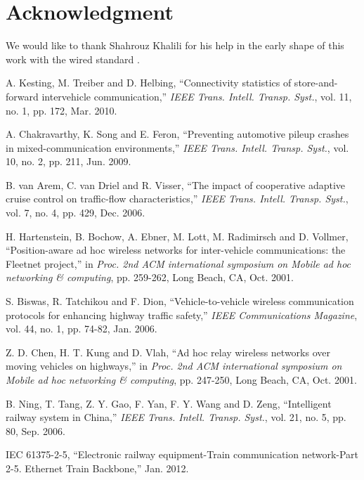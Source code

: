 \documentclass[10pt,english,two column]{IEEEtran}
\begin{document}
\section*{Acknowledgment}

We would like to thank Shahrouz Khalili for his help in the early
shape of this work with the wired standard \cite{IEC 61375}. 
\begin{thebibliography}{10}
A. Kesting, M. Treiber and D. Helbing, ``Connectivity
statistics of store-and-forward intervehicle communication,''\textit{
IEEE Trans. Intell. Transp. Syst.}, vol. 11, no. 1, pp. 172,
Mar. 2010.

A. Chakravarthy, K. Song and E. Feron, \textquotedblleft Preventing
automotive pileup crashes in mixed-communication environments,\textquotedblright{}
\textit{IEEE Trans. Intell. Transp. Syst.}, vol. 10, no. 2, pp. 211,
Jun. 2009.

B. van Arem, C. van Driel and R. Visser, \textquotedblleft The
impact of cooperative adaptive cruise control on traffic-flow characteristics,\textquotedblright{}
\textit{IEEE Trans. Intell. Transp. Syst.}, vol. 7, no. 4, pp. 429,
Dec. 2006.

H. Hartenstein, B. Bochow, A. Ebner, M. Lott, M.
Radimirsch and D. Vollmer, ``Position-aware ad hoc wireless networks
for inter-vehicle communications: the Fleetnet project,'' in \textit{Proc.
2nd ACM international symposium on Mobile ad hoc networking \& computing},
pp. 259-262, Long Beach, CA, Oct. 2001.

S. Biswas, R. Tatchikou and F. Dion, ``Vehicle-to-vehicle
wireless communication protocols for enhancing highway traffic safety,''
\textit{IEEE Communications Magazine}, vol. 44, no. 1, pp. 74-82,
Jan. 2006. 

Z. D. Chen, H. T. Kung and D. Vlah, ``Ad hoc relay
wireless networks over moving vehicles on highways,'' in \textit{Proc.
2nd ACM international symposium on Mobile ad hoc networking \& computing},
pp. 247-250, Long Beach, CA, Oct. 2001.

B. Ning, T. Tang, Z. Y. Gao, F. Yan, F. Y. Wang and
D. Zeng, \textquotedblleft Intelligent railway system in China,\textquotedblright{}
\textit{IEEE Trans. Intell. Transp. Syst.}, vol. 21, no. 5, pp. 80,
Sep. 2006.

IEC 61375-2-5, ``Electronic railway equipment-Train
communication network-Part 2-5. Ethernet Train Backbone,'' Jan. 2012.


\end{thebibliography}
\end{document}
